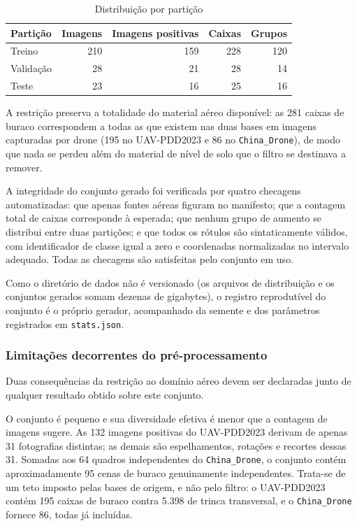 \documentclass[12pt]{article}
\newcommand{\fonte}[1]{%
  \vspace{2pt}\par\noindent{\footnotesize Fonte: #1}}
\begin{document}
\begin{table}[ht]
\centering
\caption{Distribuição por partição}
\label{tab:particoes}
\small
\setlength{\tabcolsep}{6pt}
\renewcommand{\arraystretch}{1.15}
\begin{tabular}{l r r r r}
\hline
\textbf{Partição} & \textbf{Imagens} & \textbf{Imagens positivas} &
\textbf{Caixas} & \textbf{Grupos} \\
\hline
Treino    & 210 & 159 & 228 & 120 \\
Validação &  28 &  21 &  28 &  14 \\
Teste     &  23 &  16 &  25 &  16 \\
\hline
\end{tabular}
\fonte{elaborado pelo autor, 2026.}
\end{table}

A restrição preserva a totalidade do material aéreo disponível: as 281
caixas de buraco correspondem a todas as que existem nas duas bases em
imagens capturadas por drone (195 no UAV-PDD2023 e 86 no
\texttt{China\_Drone}), de modo que nada se perdeu além do material de
nível de solo que o filtro se destinava a remover.

A integridade do conjunto gerado foi verificada por quatro checagens
automatizadas: que apenas fontes aéreas figuram no manifesto; que a
contagem total de caixas corresponde à esperada; que nenhum grupo de
aumento se distribui entre duas partições; e que todos os rótulos são
sintaticamente válidos, com identificador de classe igual a zero e
coordenadas normalizadas no intervalo adequado. Todas as checagens são
satisfeitas pelo conjunto em uso.

Como o diretório de dados não é versionado (os arquivos de distribuição e
os conjuntos gerados somam dezenas de gigabytes), o registro reprodutível
do conjunto é o próprio gerador, acompanhado da semente e dos parâmetros
registrados em \texttt{stats.json}.

\subsubsection{Limitações decorrentes do pré-processamento}
\label{sec:limitacoes-preproc}

Duas consequências da restrição ao domínio aéreo devem ser declaradas
junto de qualquer resultado obtido sobre este conjunto.

O conjunto é pequeno e sua diversidade efetiva é menor que a contagem de
imagens sugere. As 132 imagens positivas do UAV-PDD2023 derivam de apenas
31 fotografias distintas; as demais são espelhamentos, rotações e
recortes dessas 31. Somadas aos 64 quadros independentes do
\texttt{China\_Drone}, o conjunto contém aproximadamente 95 cenas de
buraco genuinamente independentes. Trata-se de um teto imposto pelas
bases de origem, e não pelo filtro: o UAV-PDD2023 contém 195 caixas de
buraco contra 5.398 de trinca transversal, e o \texttt{China\_Drone}
fornece 86, todas já incluídas.
\end{document}
